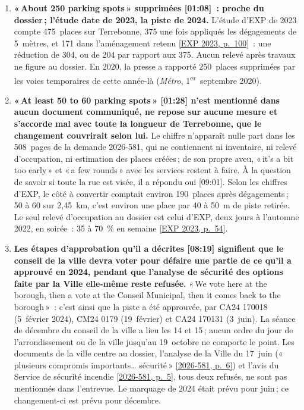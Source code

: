 \documentclass[11pt,letterpaper]{article}
\newcommand{\repourl}{https://github.com/OpenMobilityData/Terrebonne-open-sources}
\newcommand{\pagesurl}{https://openmobilitydata.github.io/Terrebonne-access-requests}
\newcommand{\cliptime}[1]{\textsf{\small[#1]}}
\newcommand{\pgl}[2]{\href{\pagesurl/2026-581/raw/01_emails_mandate_counts.pdf\#page=#1}{\textsf{\small[2026-581, p.~#2]}}}
\newcommand{\pg}[1]{\pgl{#1}{#1}}
\newcommand{\exppg}[1]{\href{\repourl/blob/main/2023-exp-mobility-study/raw/EXP_Etude_de_mobilite_rue_de_Terrebonne_2023.pdf}{\textsf{\small[EXP 2023, p.~#1]}}}
\begin{document}
\begin{enumerate}[nosep]
  \item \begin{minipage}[t]{\linewidth}\textbf{«\,About 250 parking spots\,» supprimées \cliptime{01:08}~: proche du dossier\,; l'étude date de 2023, la piste de 2024.} L'étude d'EXP de 2023 compte 475~places sur Terrebonne, 375 une fois appliqués les dégagements de 5~mètres, et 171 dans l'aménagement retenu \exppg{100}~: une réduction de 304, ou de 204 par rapport aux 375. Aucun relevé après travaux ne figure au dossier. En 2020, la presse a rapporté 250~places supprimées par les voies temporaires de cette année-là (\emph{Métro}, 1\textsuperscript{er}~septembre 2020).\end{minipage}\vspace{0.35em}
  \item \begin{minipage}[t]{\linewidth}\textbf{«\,At least 50 to 60 parking spots\,» \cliptime{01:28} n'est mentionné dans aucun document communiqué, ne repose sur aucune mesure et s'accorde mal avec toute la longueur de Terrebonne, que le changement couvrirait selon lui.} Le chiffre n'apparaît nulle part dans les 508~pages de la demande 2026-581, qui ne contiennent ni inventaire, ni relevé d'occupation, ni estimation des places créées\,; de son propre aveu, «\,it's a bit too early\,» et «\,a few rounds\,» avec les services restent à faire. À la question de savoir si toute la rue est visée, il a répondu oui \cliptime{09:01}. Selon les chiffres d'EXP, le côté à convertir comptait environ 190~places après dégagements\,; 50 à 60 sur 2{,}45~km, c'est environ une place par 40 à 50~m de piste retirée. Le seul relevé d'occupation au dossier est celui d'EXP, deux jours à l'automne 2022, en soirée~: 35 à 70~\% en semaine \exppg{54}.\end{minipage}\vspace{0.35em}
  \item \begin{minipage}[t]{\linewidth}\textbf{Les étapes d'approbation qu'il a décrites \cliptime{08:19} signifient que le conseil de la ville devra voter pour défaire une partie de ce qu'il a approuvé en 2024, pendant que l'analyse de sécurité des options faite par la Ville elle-même reste refusée.} «\,We vote here at the borough, then a vote at the Conseil Municipal, then it comes back to the borough\,»~: c'est ainsi que la piste a été approuvée, par CA24 170018 (5~février 2024), CM24 0179 (19~février) et CA24 170131 (3~juin). La séance de décembre du conseil de la ville a lieu les 14 et 15\,; aucun ordre du jour de l'arrondissement ou de la ville jusqu'au 19~octobre ne comporte le point. Les documents de la ville centre au dossier, l'analyse de la Ville du 17~juin («\,plusieurs compromis importants… sécurité\,» \pg{6}) et l'avis du Service de sécurité incendie \pg{5}, tous deux refusés, ne sont pas mentionnés dans l'entrevue. Le marquage de 2024 était prévu pour juin\,; ce changement-ci est prévu pour décembre.\end{minipage}\vspace{0.35em}

\end{enumerate}
\end{document}
